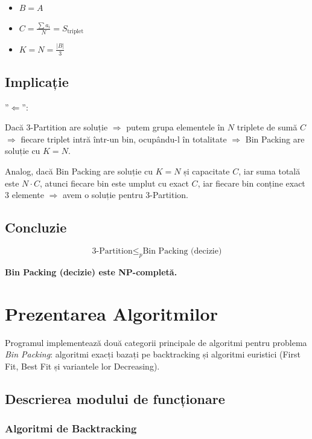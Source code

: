\documentclass[runningheads]{llncs}
\begin{document}
	\begin{itemize}
		\item $B = A$
		\item $C = \frac{\sum a_i}{N} = S_{\text{triplet}}$
		\item $K = N = \frac{|B|}{3}$
	\end{itemize}

	\subsection{Implicație}

	{\Large ''$\Leftarrow$'':}

	{\indent Dacă 3-Partition are soluție $\Rightarrow$ putem grupa elementele în $N$ triplete de sumă $C$ $\Rightarrow$ fiecare triplet intră într-un bin, ocupându-l în totalitate $\Rightarrow$ Bin Packing are soluție cu $K = N$.}



	Analog, dacă Bin Packing are soluție cu $K = N$ și capacitate $C$, iar suma totală este $N \cdot C$, atunci fiecare bin este umplut cu exact $C$, iar fiecare bin conține exact 3 elemente $\Rightarrow$ avem o soluție pentru 3-Partition.

	\subsection{Concluzie}



	\[
	\text{3-Partition} \le_p \text{Bin Packing (decizie)}
	\]



	\textbf{Bin Packing (decizie) este NP-completă.}

	\section{Prezentarea Algoritmilor}

	Programul implementează două categorii principale de algoritmi pentru problema \textit{Bin Packing}: algoritmi exacți bazați pe backtracking și algoritmi euristici (First Fit, Best Fit și variantele lor Decreasing).

	\subsection{Descrierea modului de funcționare}

	\subsubsection{Algoritmi de Backtracking}
\end{document}
